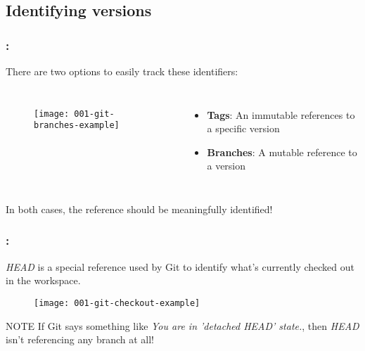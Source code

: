 \subsection{Identifying versions}

\begin{frame}
    \frametitle{\secname: \small\subsecname\normalsize}

    There are two options to easily track these identifiers:

    \begin{columns}

        \begin{figure}[h]
            \texttt{[image: 001-git-branches-example]}
            \centering
        \end{figure}


        \begin{itemize}
            \item \textbf{Tags}: An immutable references to a specific version
            \item \textbf{Branches}: A mutable reference to a version
        \end{itemize}
    \end{columns}

    \vspace{\baselineskip}
    In both cases, the reference should be meaningfully identified!
\end{frame}

\begin{frame}
    \frametitle{\secname: \small\subsecname\normalsize}

    \textit{HEAD} is a special reference used by Git to identify what's currently checked out in the workspace.

    \begin{figure}[h]
        \texttt{[image: 001-git-checkout-example]}
        \centering
    \end{figure}

    \begin{alertblock}{NOTE}
        If Git says something like \textit{You are in 'detached HEAD' state.}, then \textit{HEAD} isn't referencing any branch at all!
    \end{alertblock}
\end{frame}

